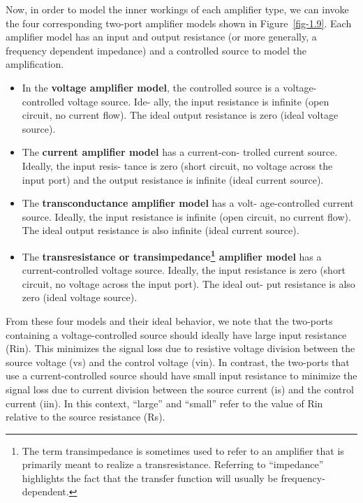 \documentclass[
  11pt,
  letterpaper,
  abstract]{scrbook}
\begin{document}
Now, in order to model the inner workings of each amplifier type, we can
invoke the four corresponding two-port amplifier models shown in
Figure~\ref{fig-1.9}. Each amplifier model has an input and output
resistance (or more generally, a frequency dependent impedance) and a
controlled source to model the amplification.

\begin{itemize}
\item
  In the \textbf{voltage amplifier model}, the controlled source is a
  voltage-controlled voltage source. Ide- ally, the input resistance is
  infinite (open circuit, no current flow). The ideal output resistance
  is zero (ideal voltage source).
\item
  The \textbf{current amplifier model} has a current-con- trolled
  current source. Ideally, the input resis- tance is zero (short
  circuit, no voltage across the input port) and the output resistance
  is infinite (ideal current source).
\item
  The \textbf{transconductance amplifier model} has a volt-
  age-controlled current source. Ideally, the input resistance is
  infinite (open circuit, no current flow). The ideal output resistance
  is also infinite (ideal current source).
\item
  The \textbf{transresistance or transimpedance\footnote{The term
    transimpedance is sometimes used to refer to an amplifier that is
    primarily meant to realize a transresistance. Referring to
    ``impedance'' highlights the fact that the transfer function will
    usually be frequency-dependent.} amplifier model} has a
  current-controlled voltage source. Ideally, the input resistance is
  zero (short circuit, no voltage across the input port). The ideal out-
  put resistance is also zero (ideal voltage source).
\end{itemize}

From these four models and their ideal behavior, we note that the
two-ports containing a voltage-controlled source should ideally have
large input resistance (Rin). This minimizes the signal loss due to
resistive voltage division between the source voltage (vs) and the
control voltage (vin). In contrast, the two-ports that use a
current-controlled source should have small input resistance to minimize
the signal loss due to current division between the source current (is)
and the control current (iin). In this context, ``large'' and ``small''
refer to the value of Rin relative to the source resistance (Rs).
\end{document}
